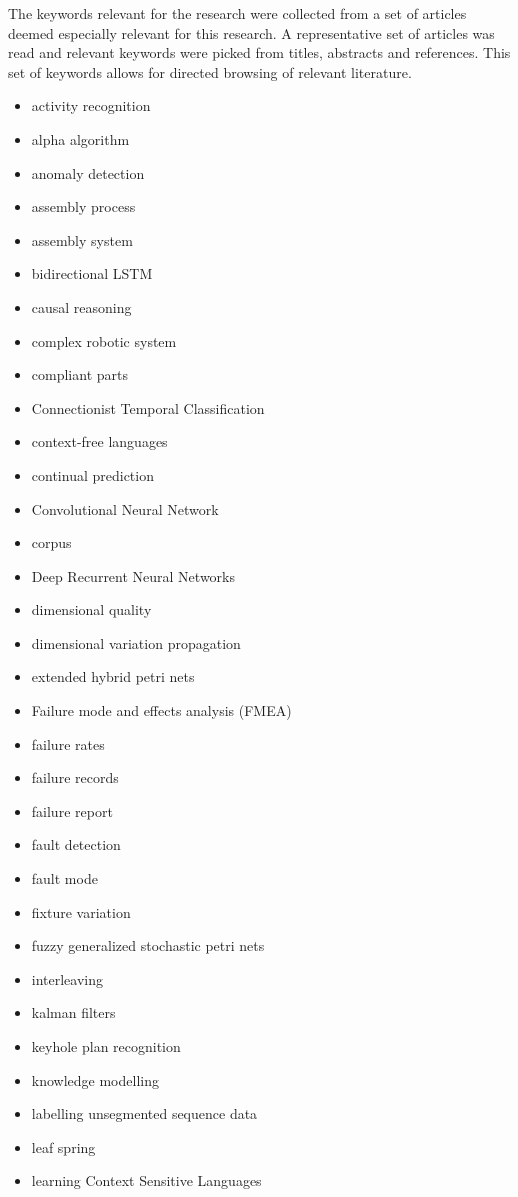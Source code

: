 \documentclass[a4paper,10pt]{article}
\begin{document}
The keywords relevant for the research were collected from a set of articles deemed especially relevant for this research. A representative set of articles was
read and relevant keywords were picked from titles, abstracts and references. This set of keywords allows for directed browsing of relevant literature.

\begin{itemize}
 \item activity recognition
 \item alpha algorithm
 \item anomaly detection
 \item assembly process
 \item assembly system
 \item bidirectional LSTM
 \item causal reasoning
 \item complex robotic system
 \item compliant parts
 \item Connectionist Temporal Classification
 \item context-free languages
 \item continual prediction
 \item Convolutional Neural Network
 \item corpus
 \item Deep Recurrent Neural Networks
 \item dimensional quality
 \item dimensional variation propagation
 \item extended hybrid petri nets
 \item Failure mode and effects analysis (FMEA)
 \item failure rates
 \item failure records
 \item failure report
 \item fault detection
 \item fault mode
 \item fixture variation
 \item fuzzy generalized stochastic petri nets
 \item interleaving
 \item kalman filters
 \item keyhole plan recognition
 \item knowledge modelling
 \item labelling unsegmented sequence data
 \item leaf spring
 \item learning Context Sensitive Languages

\end{itemize}
\end{document}
